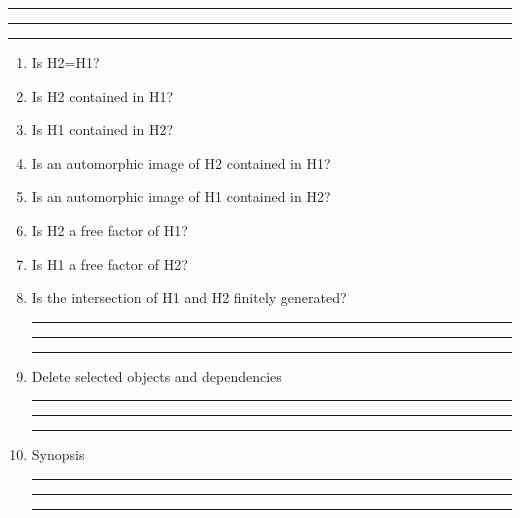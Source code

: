 
\bigskip
\hrule\hrule\hrule

\begin{enumerate}

\item Is H2=H1?

\item Is H2 contained in H1?

\item Is H1 contained in H2?

\item Is an automorphic image of H2 contained in H1?

\item Is an automorphic image of H1 contained in H2?

\item Is H2 a free factor of H1?

\item Is H1 a free factor of H2?

\item Is the intersection of H1 and H2 finitely generated?

\bigskip
\hrule\hrule\hrule

\item Delete selected objects and dependencies

\bigskip
\hrule\hrule\hrule

\item
Synopsis

\bigskip
\hrule\hrule\hrule

\end{enumerate}

